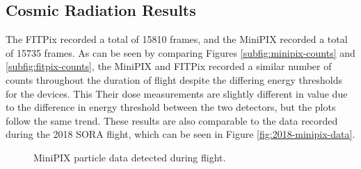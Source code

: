 \subsection{Cosmic Radiation Results}
\label{sec:Cosmic-Radiation-Results}

The FITPix recorded a total of 15810 frames, and the MiniPIX recorded a total of 15735 frames.
As can be seen by comparing Figures \ref{subfig:minipix-counts} and \ref{subfig:fitpix-counts}, the MiniPIX and FITPix recorded a similar number of counts throughout the duration of flight despite the differing energy thresholds for the devices.
This 
Their dose measurements are slightly different in value due to the difference in energy threshold between the two detectors, but the plots follow the same trend.
These results are also comparable to the data recorded during the 2018 SORA flight, which can be seen in Figure \ref{fig:2018-minipix-data}.

\begin{figure}[h!]
\hfill
{}
\hfill
{}
\hfill
\caption{MiniPIX particle data detected during flight.}
\label{fig:minipix-data}
\end{figure}

